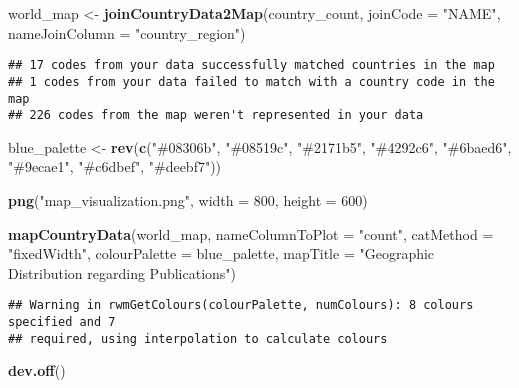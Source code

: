 \documentclass[
]{article}
\newenvironment{Shaded}{\begin{snugshade}}{\end{snugshade}}
\newcommand{\AttributeTok}[1]{\textcolor[rgb]{0.13,0.29,0.53}{#1}}
\newcommand{\DecValTok}[1]{\textcolor[rgb]{0.00,0.00,0.81}{#1}}
\newcommand{\FunctionTok}[1]{\textcolor[rgb]{0.13,0.29,0.53}{\textbf{#1}}}
\newcommand{\NormalTok}[1]{#1}
\newcommand{\OtherTok}[1]{\textcolor[rgb]{0.56,0.35,0.01}{#1}}
\newcommand{\StringTok}[1]{\textcolor[rgb]{0.31,0.60,0.02}{#1}}
\begin{document}
\begin{Shaded}
\begin{Highlighting}[]
\NormalTok{world\_map }\OtherTok{\textless{}{-}} \FunctionTok{joinCountryData2Map}\NormalTok{(country\_count, }\AttributeTok{joinCode =} \StringTok{"NAME"}\NormalTok{, }\AttributeTok{nameJoinColumn =} \StringTok{"country\_region"}\NormalTok{)}
\end{Highlighting}
\end{Shaded}

\begin{verbatim}
## 17 codes from your data successfully matched countries in the map
## 1 codes from your data failed to match with a country code in the map
## 226 codes from the map weren't represented in your data
\end{verbatim}

\begin{Shaded}
\begin{Highlighting}[]
\NormalTok{blue\_palette }\OtherTok{\textless{}{-}} \FunctionTok{rev}\NormalTok{(}\FunctionTok{c}\NormalTok{(}\StringTok{"\#08306b"}\NormalTok{, }\StringTok{"\#08519c"}\NormalTok{, }\StringTok{"\#2171b5"}\NormalTok{, }\StringTok{"\#4292c6"}\NormalTok{, }\StringTok{"\#6baed6"}\NormalTok{, }\StringTok{"\#9ecae1"}\NormalTok{, }\StringTok{"\#c6dbef"}\NormalTok{, }\StringTok{"\#deebf7"}\NormalTok{))}

\FunctionTok{png}\NormalTok{(}\StringTok{"map\_visualization.png"}\NormalTok{, }\AttributeTok{width =} \DecValTok{800}\NormalTok{, }\AttributeTok{height =} \DecValTok{600}\NormalTok{)}

\FunctionTok{mapCountryData}\NormalTok{(world\_map, }\AttributeTok{nameColumnToPlot =} \StringTok{"count"}\NormalTok{, }\AttributeTok{catMethod =} \StringTok{"fixedWidth"}\NormalTok{, }\AttributeTok{colourPalette =}\NormalTok{ blue\_palette, }\AttributeTok{mapTitle =} \StringTok{"Geographic Distribution regarding Publications"}\NormalTok{)}
\end{Highlighting}
\end{Shaded}

\begin{verbatim}
## Warning in rwmGetColours(colourPalette, numColours): 8 colours specified and 7
## required, using interpolation to calculate colours
\end{verbatim}

\begin{Shaded}
\begin{Highlighting}[]
\FunctionTok{dev.off}\NormalTok{()}
\end{Highlighting}
\end{Shaded}
\end{document}
